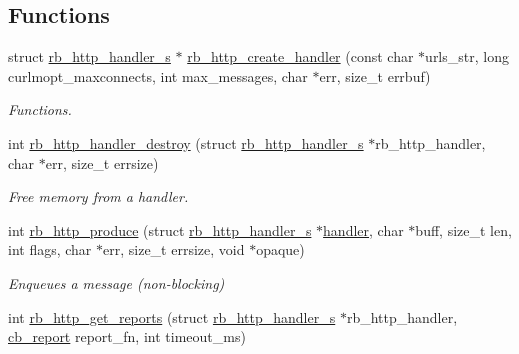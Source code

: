 \subsection*{Functions}
\begin{DoxyCompactItemize}
\item 
struct \hyperlink{structrb__http__handler__s}{rb\-\_\-http\-\_\-handler\-\_\-s} $\ast$ \hyperlink{librb-http_8h_a2a79eb842642f83d2276cd42bea95eb3}{rb\-\_\-http\-\_\-create\-\_\-handler} (const char $\ast$urls\-\_\-str, long curlmopt\-\_\-maxconnects, int max\-\_\-messages, char $\ast$err, size\-\_\-t errbuf)
\begin{DoxyCompactList}\small\item\em Functions. \end{DoxyCompactList}\item 
int \hyperlink{librb-http_8h_aea4aa423ff2034b027817632c746fd39}{rb\-\_\-http\-\_\-handler\-\_\-destroy} (struct \hyperlink{structrb__http__handler__s}{rb\-\_\-http\-\_\-handler\-\_\-s} $\ast$rb\-\_\-http\-\_\-handler, char $\ast$err, size\-\_\-t errsize)
\begin{DoxyCompactList}\small\item\em Free memory from a handler. \end{DoxyCompactList}\item 
int \hyperlink{librb-http_8h_a0d0d31d9c2dc9ed04d6722e5653b4682}{rb\-\_\-http\-\_\-produce} (struct \hyperlink{structrb__http__handler__s}{rb\-\_\-http\-\_\-handler\-\_\-s} $\ast$\hyperlink{rb__http__handler__example_8c_a0165697b451a136ac74647662a5a39e1}{handler}, char $\ast$buff, size\-\_\-t len, int flags, char $\ast$err, size\-\_\-t errsize, void $\ast$opaque)
\begin{DoxyCompactList}\small\item\em Enqueues a message (non-\/blocking) \end{DoxyCompactList}\item 
int \hyperlink{librb-http_8h_a890e981b619b1bdd5cc37fa16bb06f06}{rb\-\_\-http\-\_\-get\-\_\-reports} (struct \hyperlink{structrb__http__handler__s}{rb\-\_\-http\-\_\-handler\-\_\-s} $\ast$rb\-\_\-http\-\_\-handler, \hyperlink{librb-http_8h_abcf27caf85ec3ac2b11d1b89aed63966}{cb\-\_\-report} report\-\_\-fn, int timeout\-\_\-ms)
\end{DoxyCompactItemize}


